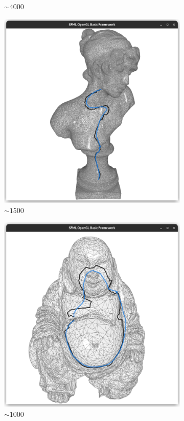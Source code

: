 \documentclass{stdlocal}
\begin{document}
\begin{figure}
\begin{subfigure}[b]{0.24\linewidth}
    \caption{$\sim 4000$}
  \end{subfigure}
  \begin{subfigure}[b]{0.24\linewidth}
    \centering
    \includegraphics[width=\linewidth,trim={25px 20 25 50},clip]{images/sappho-smooth-0.5.png}
    \caption{$\sim 1500$}
  \end{subfigure}
  \begin{subfigure}[b]{0.24\linewidth}
    \centering
    \includegraphics[width=\linewidth,trim={25px 20 25 50},clip]{images/buddha-smooth-0.5.png}
    \caption{$\sim 1000$}
  \end{subfigure}
  \caption[]{}
  \label{fig:}
\end{figure}
\end{document}
